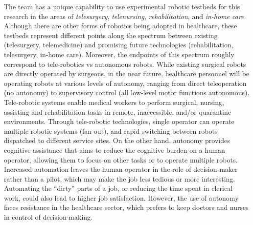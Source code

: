 \begin{itemize}


\end{itemize}

The team has a unique capability to use experimental robotic testbeds for this research in the areas of {\em telesurgery}, {\em telenursing}, {\em rehabilitation}, and {\em in-home care}.  Although there are other forms of robotics being adopted in healthcare, these testbeds represent different points along the spectrum between existing (telesurgery, telemedicine) and promising future technologies (rehabilitation, telesurgery, in-home care).  Moreover, the endpoints of this spectrum roughly correspond to tele-robotics vs autonomous robots.  While existing surgical robots are directly operated by surgeons, in the near future, healthcare personnel will be operating robots at various levels of autonomy, ranging from direct teleoperation (no autonomy) to supervisory control (all low-level motor functions autonomous). Tele-robotic systems enable medical workers to perform surgical, nursing, assisting and rehabilitation tasks in remote, inaccessible, and/or quarantine environments. Through tele-robotic technologies, single operator can operate multiple robotic systems (fan-out), and rapid switching between robots dispatched to different service sites. On the other hand, autonomy provides cognitive assistance that aims to reduce the cognitive burden on a human operator, allowing them to focus on other tasks or to operate multiple robots. Increased automation leaves the human operator in the role of decision-maker rather than a pilot, which may make the job less tedious or more interesting. Automating the “dirty” parts of a job, or reducing the time spent in clerical work, could also lead to higher job satisfaction.  However, the use of autonomy faces resistance in the healthcare sector, which prefers to keep doctors and nurses in control of decision-making.

